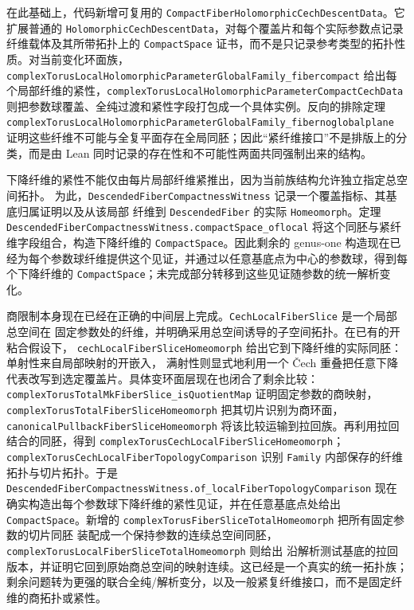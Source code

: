 \documentclass[UTF8,fontset=none,a4paper,11pt]{ctexart}
\begin{document}
\begin{sloppypar}
在此基础上，代码新增可复用的
\texttt{CompactFiberHolomorphicCechDescentData}。它扩展普通的
\texttt{HolomorphicCechDescentData}，对每个覆盖片和每个实际参数点记录纤维载体及其所带拓扑上的
\texttt{CompactSpace} 证书，而不是只记录参考类型的拓扑性质。对当前变化环面族，
\texttt{complexTorusLocalHolomorphicParameterGlobalFamily\allowbreak\_fiber\allowbreak compact}
给出每个局部纤维的紧性，\texttt{complexTorusLocalHolomorphicParameter\allowbreak CompactCechData}
则把参数球覆盖、全纯过渡和紧性字段打包成一个具体实例。反向的排除定理
\texttt{complexTorusLocalHolomorphicParameterGlobalFamily\allowbreak\_fiber\allowbreak no\allowbreak global\allowbreak plane}
证明这些纤维不可能与全复平面存在全局同胚；因此“紧纤维接口”不是排版上的分类，而是由 Lean
同时记录的存在性和不可能性两面共同强制出来的结构。
\end{sloppypar}

\begin{sloppypar}
下降纤维的紧性不能仅由每片局部纤维紧推出，因为当前族结构允许独立指定总空间拓扑。
为此，\texttt{DescendedFiberCompactnessWitness} 记录一个覆盖指标、其基底归属证明以及从该局部
纤维到 \texttt{DescendedFiber} 的实际 \texttt{Homeomorph}。定理
\texttt{DescendedFiberCompactnessWitness\allowbreak.compactSpace\allowbreak\_of\allowbreak local}
将这个同胚与紧纤维字段组合，构造下降纤维的 \texttt{CompactSpace}。因此剩余的 genus-one
构造现在已经为每个参数球纤维提供这个见证，并通过以任意基底点为中心的参数球，得到每个下降纤维的
\texttt{CompactSpace}；未完成部分转移到这些见证随参数的统一解析变化。
\end{sloppypar}

\begin{sloppypar}
商限制本身现在已经在正确的中间层上完成。\texttt{CechLocalFiberSlice} 是一个局部总空间在
固定参数处的纤维，并明确采用总空间诱导的子空间拓扑。在已有的开粘合假设下，
\texttt{cechLocalFiberSliceHomeomorph} 给出它到下降纤维的实际同胚：单射性来自局部映射的开嵌入，
满射性则显式地利用一个 Čech 重叠把任意下降代表改写到选定覆盖片。具体变环面层现在也闭合了剩余比较：
\texttt{complexTorusTotalMkFiberSlice\_isQuotientMap} 证明固定参数的商映射，
\texttt{complexTorusTotalFiberSliceHomeomorph} 把其切片识别为商环面，
\texttt{canonicalPullbackFiberSliceHomeomorph} 将该比较运输到拉回族。再利用拉回结合的同胚，得到
\texttt{complexTorusCechLocalFiberSliceHomeomorph}；\texttt{complexTorusCechLocalFiberTopologyComparison}
识别 \texttt{Family} 内部保存的纤维拓扑与切片拓扑。于是
\texttt{DescendedFiberCompactnessWitness\allowbreak.of\allowbreak\_localFiberTopologyComparison}
现在确实构造出每个参数球下降纤维的紧性见证，并在任意基底点处给出
\texttt{CompactSpace}。新增的 \texttt{complexTorusFiberSliceTotalHomeomorph} 把所有固定参数的切片同胚
装配成一个保持参数的连续总空间同胚，\texttt{complexTorusLocalFiberSliceTotalHomeomorph} 则给出
沿解析测试基底的拉回版本，并证明它回到原始商总空间的映射连续。这已经是一个真实的统一拓扑族；
剩余问题转为更强的联合全纯/解析变分，以及一般紧复纤维接口，而不是固定纤维的商拓扑或紧性。
\end{sloppypar}
\end{document}
